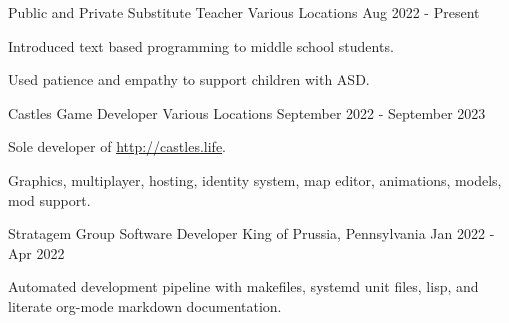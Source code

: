 

\begin{cventries}

  \cventry
    {Public and Private} %
    {Substitute Teacher} %
    {Various Locations} %
    {Aug 2022 - Present} %
    {
      \begin{cvitems} %
        \item {Introduced text based programming to middle school students.}
        \item {Used patience and empathy to support children with ASD.}
      \end{cvitems}
    }

  \cventry
    {Castles} %
    {Game Developer} %
    {Various Locations} %
    {September 2022 - September 2023} %
    {
      \begin{cvitems} %
        \item {Sole developer of \url{http://castles.life}.}
        \item {Graphics, multiplayer, hosting, identity system, map editor, animations, models, mod support.}
      \end{cvitems}
    }



  \cventry
    {Stratagem Group} %
    {Software Developer} %
    {King of Prussia, Pennsylvania} %
    {Jan 2022 - Apr 2022} %
    {
      \begin{cvitems} %
        \item {Automated development pipeline with makefiles, systemd unit files, lisp, and literate org-mode markdown documentation.}
      \end{cvitems}
    }


\end{cventries}
